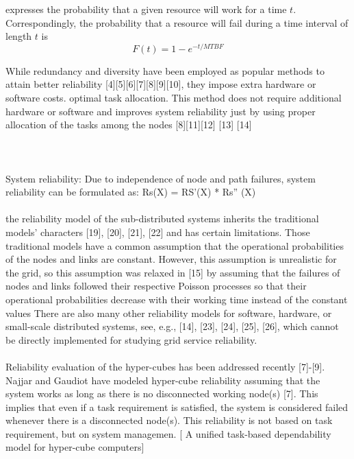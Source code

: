 \documentclass{cslthse-msc}
\begin{document}
 expresses the probability that a given resource will work for a time $t$. Correspondingly, the probability that a resource will fail during a time interval of length $t$ is
\begin{equation} \label{eq:resource_failure_prob}
F(t) = 1- e^{-t/MTBF}
\end{equation}

\iffalse
While redundancy and diversity have been employed as popular methods to attain better reliability [4][5][6][7][8][9][10], they impose extra hardware or software costs.
optimal task allocation. This method does not require additional hardware or software and improves system reliability just by using proper allocation of the tasks among the nodes [8][11][12] [13] [14] \cite{optTaskAllocationForMaxRel}
\\\\
\cite{discContRelModel}
\\\\
System reliability: Due to independence of node and path failures, system reliability can be formulated as: Rs(X) = RS’(X) * Rs” (X) \cite{optTaskAllocationForMaxRel}
\\\\
the reliability model of the sub-distributed systems inherits the traditional models’ characters [19], [20], [21], [22] and has certain limitations. Those traditional models have a common assumption that the operational probabilities of the nodes and links are constant. However, this assumption is unrealistic for the grid, so this assumption was relaxed in [15] by assuming that the failures of nodes and links followed their respective Poisson processes so that their operational probabilities decrease with their working time instead of the constant values 
There are also many other reliability models for software, hardware, or small-scale distributed systems, see, e.g., [14], [23], [24], [25], [26], which cannot be directly implemented for studying grid service reliability. \cite{hierarchicalRelModeling}
\\\\
Reliability evaluation of the hyper-cubes has been addressed recently [7]-[9]. Najjar and Gaudiot have modeled hyper-cube reliability assuming that the system works as long as there is no disconnected working node(s) [7]. This implies that even if a task requirement is satisfied, the system is considered failed whenever there is a disconnected node(s). This reliability is not based on task requirement, but on system managemen. [ A unified task-based dependability model for hyper-cube computers]
\end{document}
